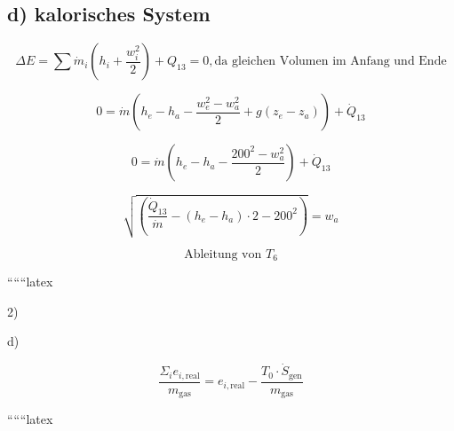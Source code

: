 \subsection*{d) kalorisches System}

\begin{equation}
\Delta E = \sum \dot{m}_i \left( h_i + \frac{w_i^2}{2} \right) + Q_{13} = 0, \text{da gleichen Volumen im Anfang und Ende}
\end{equation}

\begin{equation}
0 = \dot{m} (h_e - h_a - \frac{w_e^2 - w_a^2}{2} + g(z_e - z_a)) + \dot{Q}_{13}
\end{equation}

\begin{equation}
0 = \dot{m} (h_e - h_a - \frac{200^2 - w_a^2}{2}) + \dot{Q}_{13}
\end{equation}

\begin{equation}
\sqrt{\left( \frac{\dot{Q}_{13}}{\dot{m}} - (h_e - h_a) \cdot 2 - 200^2 \right)} = w_a
\end{equation}

\begin{equation}
\text{Ableitung von } T_6
\end{equation}

``````latex


2)

d)

\[
\frac{\Sigma_i e_{i, \text{real}}}{m_{\text{gas}}} = e_{i, \text{real}} - \frac{T_0 \cdot \dot{S}_{\text{gen}}}{m_{\text{gas}}}
\]

``````latex